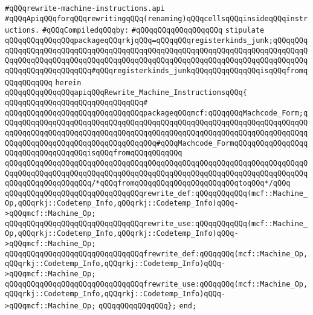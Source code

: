\label{src/lib/compiler/back/low/code/rewrite-machine-instructions.api}
\verb|#qQQqrewrite-machine-instructions.api|\newline
\verb|#qQQqApiqQQqforqQQqrewritingqQQq(renaming)qQQqcellsqQQqinsideqQQqinstructions.|\newline
\newline
\verb|#qQQqCompiledqQQqby:|\newline
\verb|#qQQqqQQqqQQqqQQqqQQq|\newline
\newline
\verb|stipulate|\newline
\verb|qQQqqQQqqQQqqQQqpackageqQQqrkjqQQq=qQQqqQQqregisterkinds_junk;qQQqqQQqqQQqqQQqqQQqqQQqqQQqqQQqqQQqqQQqqQQqqQQqqQQqqQQqqQQqqQQqqQQqqQQqqQQqqQQqqQQqqQQqqQQqqQQqqQQqqQQqqQQqqQQqqQQqqQQqqQQqqQQqqQQqqQQqqQQqqQQqqQQqqQQqqQQqqQQqqQQqqQQq#qQQqregisterkinds_junkqQQqqQQqqQQqqQQqisqQQqfromqQQqqQQqqQQq|\newline
\verb|herein|\newline
\newline
\verb|qQQqqQQqqQQqqQQqapiqQQqRewrite_Machine_InstructionsqQQq{|\newline
\verb|qQQqqQQqqQQqqQQqqQQqqQQqqQQqqQQq#|\newline
\verb|qQQqqQQqqQQqqQQqqQQqqQQqqQQqqQQqpackageqQQqmcf:qQQqqQQqMachcode_Form;qQQqqQQqqQQqqQQqqQQqqQQqqQQqqQQqqQQqqQQqqQQqqQQqqQQqqQQqqQQqqQQqqQQqqQQqqQQqqQQqqQQqqQQqqQQqqQQqqQQqqQQqqQQqqQQqqQQqqQQqqQQqqQQqqQQqqQQqqQQqqQQqqQQqqQQqqQQqqQQqqQQqqQQqqQQqqQQq#qQQqMachcode_FormqQQqqQQqqQQqqQQqqQQqqQQqqQQqqQQqqQQqisqQQqfromqQQqqQQqqQQq|\newline
\newline
\verb|qQQqqQQqqQQqqQQqqQQqqQQqqQQqqQQqqQQqqQQqqQQqqQQqqQQqqQQqqQQqqQQqqQQqqQQqqQQqqQQqqQQqqQQqqQQqqQQqqQQqqQQqqQQqqQQqqQQqqQQqqQQqqQQqqQQqqQQqqQQqqQQqqQQqqQQqqQQqqQQq/*qQQqfromqQQqqQQqqQQqqQQqqQQqqQQqtoqQQq*/qQQq|\newline
\verb|qQQqqQQqqQQqqQQqqQQqqQQqqQQqqQQqrewrite_def:qQQqqQQqqQQq(mcf::Machine_Op,qQQqrkj::Codetemp_Info,qQQqrkj::Codetemp_Info)qQQq->qQQqmcf::Machine_Op;|\newline
\verb|qQQqqQQqqQQqqQQqqQQqqQQqqQQqqQQqrewrite_use:qQQqqQQqqQQq(mcf::Machine_Op,qQQqrkj::Codetemp_Info,qQQqrkj::Codetemp_Info)qQQq->qQQqmcf::Machine_Op;|\newline
\verb|qQQqqQQqqQQqqQQqqQQqqQQqqQQqqQQqfrewrite_def:qQQqqQQq(mcf::Machine_Op,qQQqrkj::Codetemp_Info,qQQqrkj::Codetemp_Info)qQQq->qQQqmcf::Machine_Op;|\newline
\verb|qQQqqQQqqQQqqQQqqQQqqQQqqQQqqQQqfrewrite_use:qQQqqQQq(mcf::Machine_Op,qQQqrkj::Codetemp_Info,qQQqrkj::Codetemp_Info)qQQq->qQQqmcf::Machine_Op;|\newline
\verb|qQQqqQQqqQQqqQQq};|\newline
\verb|end;|\newline

